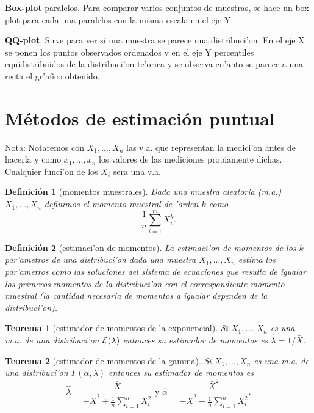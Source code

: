 \documentclass[a4paper,spanish]{article}
\newcommand{\expon}[0]{{\cal E}}
\newtheorem{teo}{Teorema}
\newtheorem{defi}{Definici\'on}
\begin{document}
\textbf{Box-plot} paralelos. Para comparar varios conjuntos de muestras, se 
hace un box plot para cada una paralelos con la misma escala en el eje Y.


\textbf{QQ-plot}. Sirve para ver si una muestra se parece una distribuci'on. 
En el eje X se ponen los puntos observados ordenados y en el eje Y percentiles 
equidistribuidos de la distribuci'on te'orica y se observa cu'anto se parece a
una recta el gr'afico obtenido.

\section{M\'etodos de estimaci\'on puntual}

Nota: Notaremos con $X_1,...,X_n$ las v.a. que representan la medici'on antes
de hacerla y como $x_1,...,x_n$ los valores de las mediciones propiamente
dichas. Cualquier funci'on de los $X_i$ sera una v.a.

\begin{defi}[momentos muestrales]
Dada una muestra aleatoria (m.a.) $X_1,...,X_n$ definimos el momento muestral 
de 'orden $k$ como 
$$\frac{1}{n} \sum_{i=1}^m X_i^k.$$
\end{defi}

\begin{defi}[estimaci'on de momentos]
La \emph{estimaci'on de momentos} de los $k$
par'ametros de una distribuci'on dada una muestra $X_1,...,X_n$ estima
los par'ametros como las soluciones del sistema de ecuaciones que resulta
de igualar los primeros momentos de la distribuci'on con el correspondiente
momento muestral (la cantidad necesaria de momentos a igualar dependen de la
distribuci'on).
\end{defi}

\begin{teo}[estimador de momentos de la exponencial]
Si $X_1,...,X_n$ es una m.a. de una distribuci'on $\expon(\lambda)$ entonces
su estimador de momentos es $\hat{\lambda} = 1 / \bar{X}$.
\end{teo}

\begin{teo}[estimador de momentos de la gamma]
Si $X_1,...,X_n$ es una m.a. de una distribuci'on $\Gamma(\alpha,  \lambda)$
entonces su estimador de momentos es 
$$\hat{\lambda} = \frac{\bar{X}}{-\bar{X}^2 + \frac{1}{n}\sum_{i=1}^n X_i^2}
\mbox{\ \ y\ \ }
\hat{\alpha} = \frac{\bar{X}^2}{-\bar{X}^2 + \frac{1}{n}\sum_{i=1}^n X_i^2}.$$
\end{teo}
\end{document}
